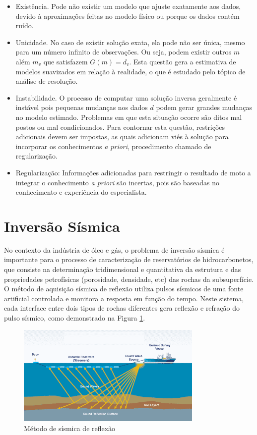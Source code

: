 \begin{itemize}
  \item Existência. Pode não existir um modelo que ajuste exatamente aos dados,
  devido à aproximações feitas no modelo físico ou porque os dados contém ruído.
  \item Unicidade. No caso de existir solução exata, ela pode não ser única,
  mesmo para um número infinito de observações. Ou seja, podem existir outros
  $m$ além $m_v$ que satisfazem $G(m)=d_v$. Esta questão gera a estimativa de
  modelos suavizados em relação à realidade, o que é estudado pelo tópico de
  análise de resolução.
  \item Instabilidade. O processo de computar uma solução inversa geralmente é
  instável pois pequenas mudanças nos dados $d$ podem gerar grandes mudanças no
  modelo estimado. Problemas em que esta situação ocorre são ditos mal postos ou
  mal condicionados. Para contornar esta questão, restrições adicionais devem
  ser impostas, as quais adicionam viés à solução para incorporar os
  conhecimentos \textit{a priori}, procedimento chamado de regularização.
  \item Regularização: Informações adicionadas para restringir o resultado de
  moto a integrar o conhecimento \textit{a priori} são incertas, pois são
  baseadas no conhecimento e experiência do especialista.
\end{itemize}



\section{Inversão Sísmica}

No contexto da indústria de óleo e gás, o problema de inversão sísmica é
importante para o processo de caracterização de reservatórios de
hidrocarbonetos, que consiste na determinação tridimensional e quantitativa da
estrutura e das propriedades petrofísicas (porosidade, densidade, etc) das
rochas da subsuperfície. O método de aquisição sísmica de reflexão utiliza
pulsos sísmicos de uma fonte artificial controlada e monitora a resposta em
função do tempo. Neste sistema, cada interface entre dois tipos de rochas
diferentes gera reflexão e refração do pulso sísmico, como demonstrado na Figura
\ref{fig:1sismica}.

\begin{figure}[ht!]
\begin{center}
  \includegraphics[width=0.8\textwidth]{fig/seismic_survey}
  \caption{Método de sísmica de reflexão \citep{figsismica}}
  \label{fig:1sismica}
\end{center}
\end{figure}


